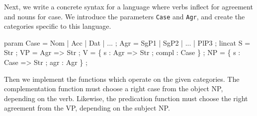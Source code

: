 \documentclass[10pt,a4paper]{article}
\newenvironment{Shaded}{\begin{snugshade}}{\end{snugshade}}
\newcommand{\DataTypeTok}[1]{\textcolor[rgb]{0.13,0.29,0.53}{{#1}}}
\newcommand{\OtherTok}[1]{\textcolor[rgb]{0.56,0.35,0.01}{{#1}}}
\newcommand{\FunctionTok}[1]{\textcolor[rgb]{0.00,0.00,0.00}{{#1}}}
\newcommand{\NormalTok}[1]{{#1}}
\begin{document}



Next, we write a concrete syntax for a language where verbs inflect
for agreement and nouns for case. 
We introduce the parameters \texttt{Case} and \texttt{Agr}, and create
the categories specific to this language.


\begin{Shaded}
\begin{Highlighting}[]
  \NormalTok{param}
    \DataTypeTok{Case} \FunctionTok{=} \DataTypeTok{Nom} \FunctionTok{|} \DataTypeTok{Acc} \FunctionTok{|} \DataTypeTok{Dat} \FunctionTok{|} \FunctionTok{...} \NormalTok{;}
    \DataTypeTok{Agr} \FunctionTok{=} \DataTypeTok{SgP1} \FunctionTok{|} \DataTypeTok{SgP2} \FunctionTok{|} \FunctionTok{...} \FunctionTok{|} \DataTypeTok{PlP3} \NormalTok{;}
  \NormalTok{lincat }
    \DataTypeTok{S}  \FunctionTok{=} \DataTypeTok{Str} \NormalTok{;}
    \DataTypeTok{VP} \FunctionTok{=} \DataTypeTok{Agr} \OtherTok{=>} \DataTypeTok{Str} \NormalTok{;}
    \DataTypeTok{V} \FunctionTok{=} \NormalTok{\{ s }\FunctionTok{:} \DataTypeTok{Agr} \OtherTok{=>} \DataTypeTok{Str} \NormalTok{; compl }\FunctionTok{:} \DataTypeTok{Case} \NormalTok{\} ;}
    \DataTypeTok{NP} \FunctionTok{=} \NormalTok{\{ s }\FunctionTok{:} \DataTypeTok{Case} \OtherTok{=>} \DataTypeTok{Str} \NormalTok{; agr }\FunctionTok{:} \DataTypeTok{Agr} \NormalTok{\} ;}
\end{Highlighting}
\end{Shaded}


Then we implement the functions which operate on the given categories.
The complementation function must choose a right case from the object
NP, depending on the verb. Likewise, the predication function must
choose the right agreement from the VP, depending on the subject NP.
\end{document}
